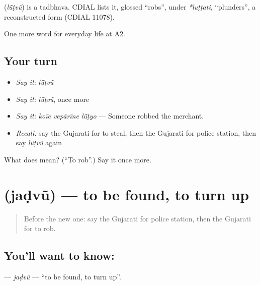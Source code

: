 \begin{cousinweb}
\textbf{} (\emph{lū̃ṭvũ}) is a tadbhava. CDIAL lists it, glossed \textquotedblleft{}robs\textquotedblright{}, under \emph{*luṭṭati}, \textquotedblleft{}plunders\textquotedblright{}, a reconstructed form (CDIAL 11078).
\end{cousinweb}

\begin{grammarlens}[title={What you've built}]
One more word for everyday life at A2.
\end{grammarlens}

\subsection*{Your turn}
\begin{itemize}
\raggedright
  \item \emph{Say it:} \emph{lū̃ṭvũ}
  \item \emph{Say it:} \emph{lū̃ṭvũ}, once more
  \item \emph{Say it:} \emph{koīe vepārīne lū̃ṭyo} — Someone robbed the merchant.
  \item \emph{Recall:} say the Gujarati for to steal, then the Gujarati for police station, then say \emph{lū̃ṭvũ} again
\end{itemize}

\begin{tcolorbox}[breakable,colback=teal!4,colframe=teal!35!black,title={Before you move on}]
What does  mean? (\textquotedblleft{}To rob\textquotedblright{}.) Say it once more.
\end{tcolorbox}
\section[\texorpdfstring{\gu{જડવું} (jaḍvũ)}{જડવું (jaḍvũ)}]{ (jaḍvũ) — to be found, to turn up}

\label{lesson:GU-C202-jadvu}



\begin{quote}
Before the new one: say the Gujarati for police station, then the Gujarati for to rob.
\end{quote}

\subsection*{You'll want to know: }
\textbf{} — \emph{jaḍvũ} — \textquotedblleft{}to be found, to turn up\textquotedblright{}.

